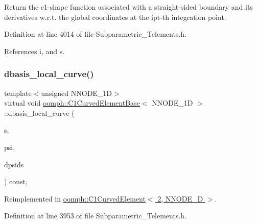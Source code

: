 Return the c1-\/shape function associated with a straight-\/sided boundary and its derivatives w.\+r.\+t. the global coordinates at the ipt-\/th integration point. 



Definition at line 4014 of file Subparametric\+\_\+\+Telements.\+h.



References i, and s.

\mbox{\label{classoomph_1_1C1CurvedElementBase_a819553bb577933323c1e9c7943d04cad}} 
\subsubsection{\texorpdfstring{dbasis\+\_\+local\+\_\+curve()}{dbasis\_local\_curve()}}
{\footnotesize\ttfamily template$<$unsigned N\+N\+O\+D\+E\+\_\+1D$>$ \\
virtual void \hyperlink{classoomph_1_1C1CurvedElementBase}{oomph\+::\+C1\+Curved\+Element\+Base}$<$ N\+N\+O\+D\+E\+\_\+1D $>$\+::dbasis\+\_\+local\+\_\+curve (\begin{DoxyParamCaption}\item[{const \hyperlink{classoomph_1_1Vector}{Vector}$<$ double $>$ \&}]{s,  }\item[{\hyperlink{classoomph_1_1Shape}{Shape} \&}]{psi,  }\item[{\hyperlink{classoomph_1_1DShape}{D\+Shape} \&}]{dpsids }\end{DoxyParamCaption}) const\hspace{0.3cm}{\ttfamily [inline]}, {\ttfamily [virtual]}}



Reimplemented in \hyperlink{classoomph_1_1C1CurvedElement_3_012_00_01NNODE__1D_01_4_acf9269ed50d607b0bd52efcca1848040}{oomph\+::\+C1\+Curved\+Element$<$ 2, N\+N\+O\+D\+E\+\_\+D $>$}.



Definition at line 3953 of file Subparametric\+\_\+\+Telements.\+h.

\mbox{\label{classoomph_1_1C1CurvedElementBase_a284de72597bf65588e53eb0b4516fa0b}} 
